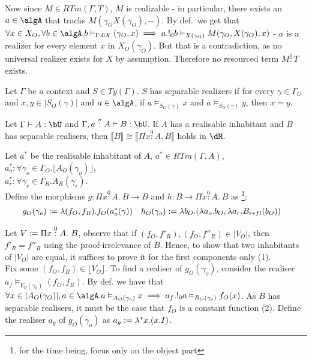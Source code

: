 \documentclass[12pt,a4paper]{article}
\def\rfl{_{refl}}
\renewcommand{\O}{_{O}}\alwaysmath{O}
\newcommand{\R}{\ensuremath{_{R}}}
\begin{document}
Now since $M \in RTm(\Gamma, T)$, $M$ is realizable - in particular, there exists an $a \in \algA$ that tracks $M(\gamma\O X(\gamma\O), -)$. By def.\ we get that $\forall x \in X\O, \forall b \in \algA. b \vDash_{\Gamma.0 X} (\gamma\O, x) \implies a . !_0 b \vDash_{X(\gamma\O)} M(\gamma\O, X(\gamma\O), x)$ - $a$ is a realizer for every element $x$ in $X\O(\gamma\O)$. But that is a contradiction, as no universal realizer exists for $X$ by assumption. Therefore no resourced term $M \overset{1}{:} T$ exists.

\begin{definition}
  Let $\Gamma$ be a context and $S \in Ty(\Gamma)$. $S$ has separable realizers if for every $\gamma \in \Gamma\O$ and $x, y  \in |S\O(\gamma)|$ and $a \in \algA$, if $a \vDash_{S\O(\gamma)} x$ and $a \vDash_{S\O(\gamma)} y$, then $x = y$.
\end{definition}

\begin{thm}
    Let $\Gamma \vdash A : \bU$ and $\Gamma, a \overset{\sigma}{:} A \vdash B : \bU$. If $A$ has a realisable inhabitant and $B$ has separable realisers, then $ \llbracket B \rrbracket \cong \llbracket \Pi x \overset{0}:A.\, B \rrbracket$ holds in $\dM$.
\end{thm}
Let $a^*$ be the realisable inhabitant of $A$, $a^* \in RTm(\Gamma, A)$, $a^*_o : \forall \gamma_o \in \Gamma\O.\lfloor A\O(\gamma_o) \rfloor$,\\ $a^*_r : \forall \gamma_r \in \Gamma\R . A\R(\gamma_r)$. \\
Define the morphisms $g : \Pi x \overset{0}:A.\ B \to B$ and $h : B \to \Pi x \overset{0}:A.\ B$ as \footnote{for the time being, focus only on the object part}:
\begin{align*}
{g\O}(\gamma_o) &\define \lambda (f\O, f\R). f\O(a^*_o(\gamma)) && {h\O}(\gamma_o) \define \lambda b\O. (\lambda a_o. b\O, \lambda a_r. B\rfl(b\O))
\end{align*}

Let $V \define \Pi x \overset{0}:A.\ B$, observe that if $(f\O, f'\R), (f\O, f''\R) \in |V\O|$, then $f'\R = f''\R$ using the proof-irrelevance of $B$. Hence, to show that two inhabitants of $|V\O|$ are equal, it suffices to prove it for the first components only (1).\\

Fix some $(f\O, f\R) \in \lfloor V\O \rfloor$. To find a realiser of $g\O(\gamma_o)$, consider the realiser $a_f \vDash_{V\O(\gamma_o)} (f\O, f\R)$. By def. we have that $\forall x \in |A\O(\gamma_O)|, a \in \algA . a \vDash_{A\O(\gamma_o)} x \implies a_f . !_0 a \vDash_{B\O(\gamma_o)} f\O(x)$. As $B$ has separable realisers, it must be the case that $f\O$ is a constant function (2). Define the realiser $a_g$ of $g\O(\gamma_o)$ as $a_g := \lambda^* x. (x . I)$.
\end{document}
